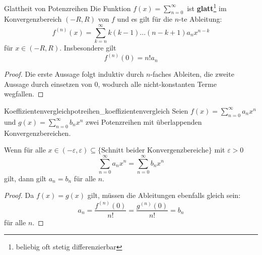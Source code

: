 \begin{korollar}{Glattheit von Potenzreihen}{}
Die Funktion $f(x) = \sum_{n=0}^\infty$ ist \textbf{glatt}\footnote{beliebig oft stetig differenzierbar} im Konvergenzbereich $(-R,R)$ von $f$ und es gilt für die $n$-te Ableitung:
$$f^{(n)}(x) = \sum_{k=n}^\infty k(k-1)...(n-k+1)a_nx^{n-k}$$
für $x \in (-R, R)$. Insbesondere gilt
$$f^{(n)}(0) = n! a_n$$
\end{korollar}
\begin{proof}
Die erste Aussage folgt induktiv durch $n$-faches Ableiten, die zweite Aussage durch einsetzen von $0$, wodurch alle nicht-konstanten Terme wegfallen.
\end{proof}
\begin{korollar}{Koeffizientenvergleich}{potreihen_koeffizientenvergleich}
Seien $f(x) = \sum_{n=0}^\infty a_nx^n$ und $g(x) = \sum_{n=0}^\infty b_nx^n$ zwei Potenzreihen mit überlappenden Konvergenzbereichen.

Wenn für alle $x \in (-\varepsilon, \varepsilon) \subseteq \{ \text{Schnitt beider Konvergenzbereiche}\}$ mit $\varepsilon > 0$
$$\sum_{n=0}^\infty a_nx^n =\sum_{n=0}^\infty b_nx^n$$
gilt, dann gilt $a_n = b_n$ für alle $n$.
\end{korollar}
\begin{proof}
Da $f(x) = g(x)$ gilt, müssen die Ableitungen ebenfalls gleich sein:
$$a_n = \frac{f^{(n)}(0)}{n!} = \frac{g^{(n)}(0)}{n!} = b_n$$
für alle $n$.
\end{proof}

